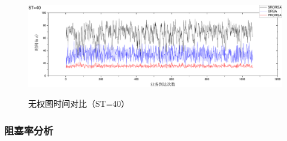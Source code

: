 \begin{figure}
\setlength{\belowcaptionskip}{-0.5cm}
\begin{center}
{\includegraphics[width=1 \textwidth]{figures/B40T.pdf}}
\end{center}
\caption{{\footnotesize{无权图时间对比（ST=40）}}}
\label{B40T}
\end{figure}
\subsubsection{阻塞率分析}

